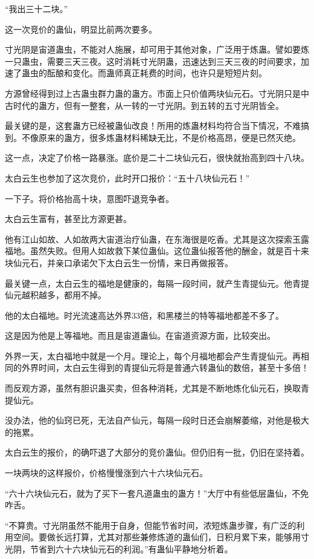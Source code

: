 \begin{this_body}
“我出三十二块。”

这一次竞价的蛊仙，明显比前两次要多。

寸光阴是宙道蛊虫，不能对人施展，却可用于其他对象，广泛用于炼蛊。譬如要炼一只蛊虫，需要三天三夜。这时消耗寸光阴蛊，迅速达到三天三夜的时间要求，加速了蛊虫的酝酿和变化。而蛊师真正耗费的时间，也许只是短短片刻。

方源曾经得到过上古蛊虫群力蛊的蛊方。市面上只价值两块仙元石。寸光阴只是中古时代的蛊方，但有一整套，从一转的一寸光阴。到五转的五寸光阴皆全。

最关键的是，这套蛊方已经被蛊仙改良！所用的炼蛊材料均符合当下情况，不难搞到。不像原来的蛊方，很多炼蛊材料稀缺无比，不是价格高昂，便是已然灭绝。

这一点，决定了价格一路暴涨。底价是二十二块仙元石，很快就抬高到四十八块。

太白云生也参加了这次竞价，此时开口报价：“五十八块仙元石！”

一下子。将价格抬高十块，意图吓退竞争者。

太白云生富有，甚至比方源更甚。

他有江山如故、人如故两大宙道治疗仙蛊，在东海很是吃香。尤其是这次探索玉露福地。虽然失败。但用人如故救下某位蛊仙。这位蛊仙报答他的酬金，就是百十来块仙元石，并亲口承诺欠下太白云生一份情，来日再做报答。

最关键一点，太白云生的福地是健康的，每隔一段时间，就产生青提仙元。他青提仙元越积越多，都用不掉。

他的太白福地。时光流速高达外界33倍，和黑楼兰的特等福地都差不多了。

这是因为他是上等福地。而且是宙道蛊仙。在宙道资源方面，比较突出。

外界一天，太白福地中就是一个月。理论上，每个月福地都会产生青提仙元。再相同的外界时间，太白云生得到的青提仙元将是普通六转蛊仙的数倍，甚至十多倍！

而反观方源，虽然有胆识蛊买卖，但各种消耗，尤其是不断地炼化仙元石，换取青提仙元。

没办法，他的仙窍已死，无法自产仙元，每隔一段时日还会崩解萎缩，对他是极大的拖累。

太白云生的报价，的确吓退了大部分的竞价蛊仙。但仍旧有一批，仍旧在坚持着。

一块两块的这样报价，价格慢慢涨到六十六块仙元石。

“六十六块仙元石，就为了买下一套凡道蛊虫的蛊方！”大厅中有些低层蛊仙，不免咋舌。

“不算贵。寸光阴虽然不能用于自身，但能节省时间，浓短炼蛊步骤，有广泛的利用空间。要做长远打算，尤其对那些兼修炼道的蛊仙们，日积月累下来，能够用寸光阴，节省到六十六块仙元石的利润。”有蛊仙平静地分析着。


\end{this_body}
